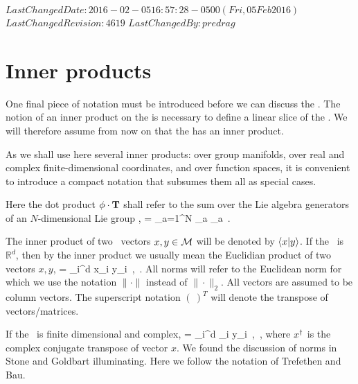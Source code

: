 \ifsvnmulti
	{$LastChangedDate: 2016-02-05 16:57:28 -0500 (Fri, 05 Feb 2016) $}
	{$LastChangedRevision: 4619 $} {$LastChangedBy: predrag $}
\fi

\section{Inner products}
\label{def:innerProduct}

One final piece of notation must be introduced before we can discuss
the \mslices. The notion of an inner product on the {\statesp} is
necessary to define a linear slice of the {\statesp}. We will
therefore assume from now on that the {\statesp} has an inner product.

As we shall use here several inner products:
over group manifolds, over real and complex finite-dimensional
coordinates, and over function spaces, it is convenient to introduce a
compact notation that subsumes them all as special cases.

Here the dot product ${\bf \phi} \cdot \mathbf{T}$ shall refer to the sum over
the Lie algebra generators of an $N$-dimensional Lie group \Group,
\beq
\gSpace \cdot \Lg = \sum_{a=1}^N \gSpace_a \Lg_a
\,.

The inner product of two \statesp\ vectors $x, y \in \mathcal{M}$ will be denoted
by $\braket{x}{y}$. If the \statesp\ is $\mathbb{R}^d$, then by the inner
product we usually mean the Euclidian product of two vectors $x,y$,
\beq
{} = \sum_i^d {x}_i y_i
    \,,\qquad \pS \subset \reals
\,.
All norms will refer to the Euclidean norm for which we use the notation
$\|\cdot\|$ instead of  $\|\cdot\|_2$. All vectors are assumed to be
column vectors. The superscript notation $(~)^T$ will denote the
transpose of vectors/matrices.

If the \statesp\ is finite dimensional and complex,
\beq
{} = \sum_i^d _i y_i
    \,,\qquad \pS \subset \complex
\,,
where ${x}^\dag$ is the complex conjugate transpose of vector $x$.
We found the discussion of norms in Stone and Goldbart
illuminating.
Here we follow the notation of Trefethen and Bau.

